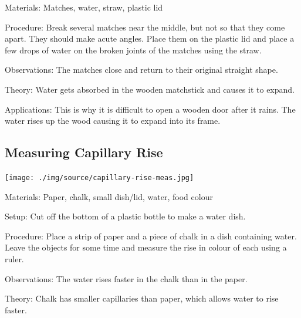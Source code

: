 \begin{multicols}{2}
\begin{description*}
\item[Materials:]{Matches, water, straw, plastic lid}
\item[Procedure:]{Break several matches near the middle, but not so that they come apart. They should make acute angles. Place them on the plastic lid and place a few drops of water on the broken joints of the matches using the straw.}
\item[Observations:]{The matches close and return to their original straight shape.}
\item[Theory:]{Water gets absorbed in the wooden matchstick and causes it to expand.}
\item[Applications:]{This is why it is difficult to open a wooden door after it rains. The water rises up the wood causing it to expand into its frame.}
\end{description*}

\columnbreak

\subsection{Measuring Capillary Rise}

\begin{center}
\texttt{[image: ./img/source/capillary-rise-meas.jpg]}
\end{center}

\begin{description*}
\item[Materials:]{Paper, chalk, small dish/lid, water, food colour}
\item[Setup:]{Cut off the bottom of a plastic bottle to make a water dish.}
\item[Procedure:]{Place a strip of paper and a piece of chalk in a dish containing water. Leave the objects for some time and measure the rise in colour of each using a ruler.}
\item[Observations:]{The water rises faster in the chalk than in the paper.}
\item[Theory:]{Chalk has smaller capillaries than paper, which allows water to rise faster.}
\end{description*}


\end{multicols}
